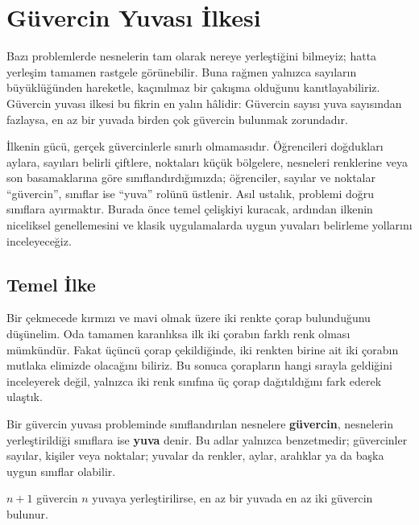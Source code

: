 \chapter[Güvercin Yuvası İlkesi · \textit{Temel}]{Güvercin Yuvası İlkesi}

Bazı problemlerde nesnelerin tam olarak nereye yerleştiğini bilmeyiz; hatta yerleşim tamamen rastgele görünebilir. Buna rağmen yalnızca sayıların büyüklüğünden hareketle, kaçınılmaz bir çakışma olduğunu kanıtlayabiliriz. Güvercin yuvası ilkesi bu fikrin en yalın hâlidir: Güvercin sayısı yuva sayısından fazlaysa, en az bir yuvada birden çok güvercin bulunmak zorundadır.

İlkenin gücü, gerçek güvercinlerle sınırlı olmamasıdır. Öğrencileri doğdukları aylara, sayıları belirli çiftlere, noktaları küçük bölgelere, nesneleri renklerine veya son basamaklarına göre sınıflandırdığımızda; öğrenciler, sayılar ve noktalar ``güvercin'', sınıflar ise ``yuva'' rolünü üstlenir. Asıl ustalık, problemi doğru sınıflara ayırmaktır. Burada önce temel çelişkiyi kuracak, ardından ilkenin niceliksel genellemesini ve klasik uygulamalarda uygun yuvaları belirleme yollarını inceleyeceğiz.

\section{Temel İlke}

Bir çekmecede kırmızı ve mavi olmak üzere iki renkte çorap bulunduğunu düşünelim. Oda tamamen karanlıksa ilk iki çorabın farklı renk olması mümkündür. Fakat üçüncü çorap çekildiğinde, iki renkten birine ait iki çorabın mutlaka elimizde olacağını biliriz. Bu sonuca çorapların hangi sırayla geldiğini inceleyerek değil, yalnızca iki renk sınıfına üç çorap dağıtıldığını fark ederek ulaştık.

\begin{definition}
Bir güvercin yuvası probleminde sınıflandırılan nesnelere \textbf{güvercin}, nesnelerin yerleştirildiği sınıflara ise \textbf{yuva} denir. Bu adlar yalnızca benzetmedir; güvercinler sayılar, kişiler veya noktalar; yuvalar da renkler, aylar, aralıklar ya da başka uygun sınıflar olabilir.
\end{definition}

\begin{theorem}
$n+1$ güvercin $n$ yuvaya yerleştirilirse, en az bir yuvada en az iki güvercin bulunur.
\end{theorem}


